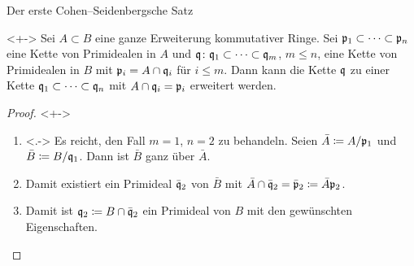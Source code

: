 \begin{frame}{Der erste Cohen--Seidenbergsche Satz}
	\begin{theorem}["`Going-up"']<+->
		Sei \(A \subset B\) eine ganze Erweiterung kommutativer Ringe. Sei
		\(\mathfrak{p}_1 \subset \dotsb \subset \mathfrak{p}_n\) eine Kette von
		Primidealen in \(A\) und
		\(\mathfrak{q}\colon \mathfrak{q}_1 \subset \dotsb \subset \mathfrak{q}_m\), \(m \le n\), eine
		Kette von Primidealen in \(B\) mit \(\mathfrak{p}_i = A \cap \mathfrak{q}_i\)
		für \(i \le m\). Dann kann die Kette \(\mathfrak{q}\) zu einer Kette
		\(\mathfrak{q}_1 \subset \dotsb \subset \mathfrak{q}_n\) mit \(A \cap
		\mathfrak{q}_i = \mathfrak{p}_i\) erweitert werden.
	\end{theorem}
	\begin{proof}<+->
		\begin{enumerate}[<+->]
		\item<.->
			Es reicht, den Fall \(m = 1\), \(n = 2\) zu behandeln. Seien \(\bar A
			\coloneqq A/\mathfrak{p}_1\) und \(\bar B \coloneqq B/\mathfrak{q}_1\).
			Dann ist \(\bar B\) ganz über \(\bar A\).
		\item
			 Damit existiert ein Primideal \(\bar{\mathfrak{q}}_2\) von \(\bar B\)
			 mit \(\bar A \cap \bar{\mathfrak{q}}_2 = \bar{\mathfrak{p}}_2
			 \coloneqq \bar A \mathfrak{p}_2\).
		\item
			Damit ist \(\mathfrak{q}_2 \coloneqq B \cap \bar{\mathfrak{q}}_2\) ein
			Primideal von \(B\) mit den gewünschten Eigenschaften.
			\qedhere
		\end{enumerate}
	\end{proof}
\end{frame}

